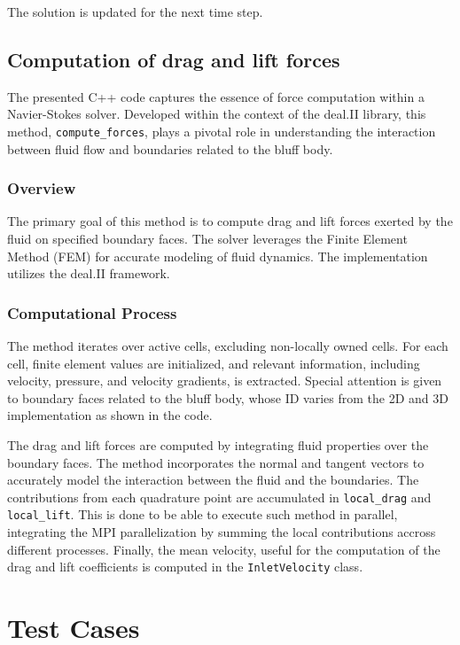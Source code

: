 \documentclass{article}
\begin{document}
The solution is updated for the next time step.

\subsection{Computation of drag and lift forces}

The presented C++ code captures the essence of force computation within a Navier-Stokes solver. Developed within the context of the deal.II library, this method, \texttt{compute\_forces}, plays a pivotal role in understanding the interaction between fluid flow and boundaries related to the bluff body.

\subsubsection{Overview}

The primary goal of this method is to compute drag and lift forces exerted by the fluid on specified boundary faces. The solver leverages the Finite Element Method (FEM) for accurate modeling of fluid dynamics. The implementation utilizes the deal.II framework.

\subsubsection{Computational Process}

The method iterates over active cells, excluding non-locally owned cells. For each cell, finite element values are initialized, and relevant information, including velocity, pressure, and velocity gradients, is extracted. Special attention is given to boundary faces related to the bluff body, whose ID varies from the 2D and 3D implementation as shown in the code.

The drag and lift forces are computed by integrating fluid properties over the boundary faces. The method incorporates the normal and tangent vectors to accurately model the interaction between the fluid and the boundaries. The contributions from each quadrature point are accumulated in \texttt{local\_drag} and \texttt{local\_lift}. This is done to be able to execute such method in parallel, integrating the MPI parallelization by summing the local contributions accross different processes.
Finally, the mean velocity, useful for the computation of the drag and lift coefficients is computed in the \texttt{InletVelocity} class.




\section{Test Cases}
\end{document}
